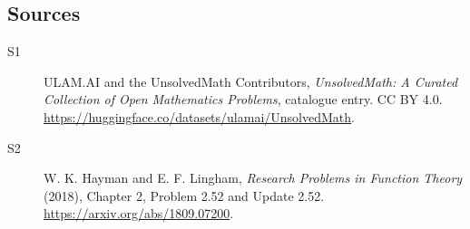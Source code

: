 \documentclass[11pt]{article}
\begin{document}
\subsection{Sources}
\begin{description}
\item[\hypertarget{source:statement:1}{S1}] ULAM.AI and the UnsolvedMath Contributors, \emph{UnsolvedMath: A Curated Collection of Open Mathematics Problems}, catalogue entry. CC BY 4.0. \url{https://huggingface.co/datasets/ulamai/UnsolvedMath}.
\item[\hypertarget{source:statement:2}{S2}] W. K. Hayman and E. F. Lingham, \emph{Research Problems in Function Theory} (2018), Chapter 2, Problem 2.52 and Update 2.52. \url{https://arxiv.org/abs/1809.07200}.
\end{description}
\label{end:statement}
\end{document}
